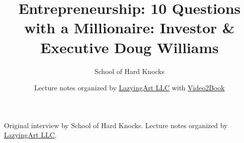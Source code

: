 \documentclass[11pt,oneside]{book}
\begin{document}
\frontmatter
\title{Entrepreneurship: 10 Questions with a Millionaire: Investor \& Executive Doug Williams}
\author{School of Hard Knocks}
\date{Lecture notes organized by \href{https://lazying.art}{LazyingArt LLC} with \href{https://github.com/lachlanchen/Video2Book}{Video2Book}}
\maketitle
\begin{center}
\small Original interview by School of Hard Knocks. Lecture notes organized by \href{https://lazying.art}{LazyingArt LLC}.
\end{center}
\clearpage
\mainmatter

\end{document}
